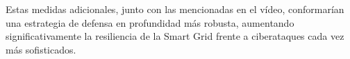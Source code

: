 \begin{enumerate}
   
   
   
   
   

\end{enumerate}

Estas medidas adicionales, junto con las mencionadas en el vídeo, conformarían una estrategia de defensa en profundidad más robusta, aumentando significativamente la resiliencia de la Smart Grid frente a ciberataques cada vez más sofisticados.